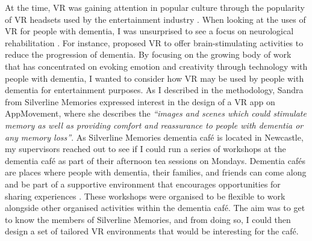 At the time, VR was gaining attention in popular culture through the popularity of VR headsets used by the entertainment industry \citep{cipriani_understanding_2014}. When looking at the uses of VR for people with dementia, I was unsurprised to see a focus on neurological rehabilitation \citep{schultheis_application_2001,mendez2015virtual}. For instance, \cite{garcia2012discussion} proposed VR to offer brain-stimulating activities to reduce the progression of dementia. By focusing on the growing body of work that has concentrated on evoking emotion \citep{wallace_design-led_2013} and creativity through technology with people with dementia, I wanted to consider how VR may be used by people with dementia for entertainment purposes. As I described in the methodology, Sandra from Silverline Memories expressed interest in the design of a VR app on AppMovement, where she describes the  \textit{``images and scenes which could stimulate memory as well as providing comfort and reassurance to people with dementia or any memory loss''}. As Silverline Memories dementia café is located in Newcastle, my supervisors reached out to see if I could run a series of workshops at the dementia café as part of their afternoon tea sessions on Mondays. Dementia cafés are places where people with dementia, their families, and friends can come along and be part of a supportive environment that encourages opportunities for sharing experiences \citep{masoud2021we}. These workshops were organised to be flexible to work alongside other organised activities within the dementia café. The aim was to get to know the members of Silverline Memories, and from doing so, I could then design a set of tailored VR environments that would be interesting for the café.

